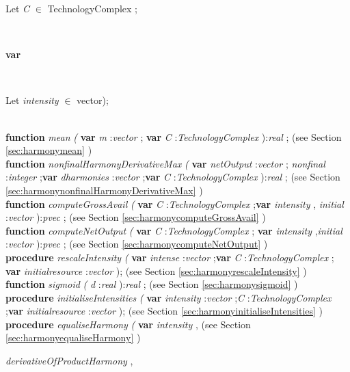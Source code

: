 \begin{tabbing}
\parbox{14cm}{\textsf{Let \textit{C} $\in$ TechnologyComplex ;}}\\
\<\parbox{14cm}{\textsf{\textbf{var} }}\\
\parbox{14cm}{\textsf{Let \textit{intensity} $\in$ vector);}}\\
\<\textsf{\textbf{function}  \textit{mean} \textit{(} \textbf{var}   \textit{m} :\textit{vector} ; \textbf{var}  \textit{C} :\textit{TechnologyComplex}    ):\textit{real} ;} (see Section \ref{sec:harmonymean} )\\
\<\textsf{\textbf{function}  \textit{nonfinalHarmonyDerivativeMax} \textit{(} \textbf{var}  \textit{netOutput} :\textit{vector} ;  \textit{nonfinal} :\textit{integer} ;\textbf{var}  \textit{dharmonies} :\textit{vector} ;\textbf{var}  \textit{C} :\textit{TechnologyComplex}   ):\textit{real} ;} (see Section \ref{sec:harmonynonfinalHarmonyDerivativeMax} )\\
\<\textsf{\textbf{function}  \textit{computeGrossAvail} \textit{(} \textbf{var}  \textit{C} :\textit{TechnologyComplex}  ;\textbf{var}     \textit{intensity} , \textit{initial} :\textit{vector} ):\textit{pvec} ;} (see Section \ref{sec:harmonycomputeGrossAvail} )\\
\<\textsf{\textbf{function}  \textit{computeNetOutput} \textit{(} \textbf{var}  \textit{C} :\textit{TechnologyComplex}  ; \textbf{var}   \textit{intensity} ,\textit{initial} :\textit{vector}  ):\textit{pvec} ;} (see Section \ref{sec:harmonycomputeNetOutput} )\\
\<\textsf{\textbf{procedure}  \textit{rescaleIntensity} \textit{(} \textbf{var}  \textit{intense} :\textit{vector} ;\textbf{var}  \textit{C} :\textit{TechnologyComplex}  ; \textbf{var}  \textit{initialresource} :\textit{vector} );} (see Section \ref{sec:harmonyrescaleIntensity} )\\
\<\textsf{\textbf{function}  \textit{sigmoid} \textit{(}   \textit{d} :\textit{real} ):\textit{real} ;} (see Section \ref{sec:harmonysigmoid} )\\
\<\textsf{\textbf{procedure}  \textit{initialiseIntensities} \textit{(} \textbf{var}  \textit{intensity} :\textit{vector} ;\textit{C} :\textit{TechnologyComplex}  ;\textbf{var}  \textit{initialresource}  :\textit{vector} );} (see Section \ref{sec:harmonyinitialiseIntensities} )\\
\<\textsf{\textbf{procedure}   \textit{equaliseHarmony} \textit{(}  \textbf{var}  \textit{intensity} ,} (see Section \ref{sec:harmonyequaliseHarmony} )\\
\parbox{14cm}{\textsf{\textit{derivativeOfProductHarmony} ,}}\\

\end{tabbing}
